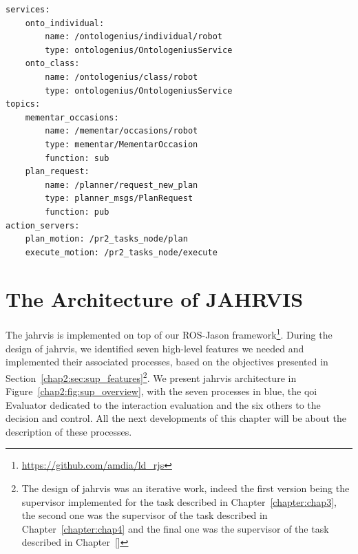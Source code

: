 \documentclass[a4paper,11pt,twoside]{StyleThese}
\begin{document}
\begin{lstlisting}[caption={Example of service, topic and action server definitions in a YAML file.}, label={chap2:lst:ros-jason}]
services:
	onto_individual: 
		name: /ontologenius/individual/robot
		type: ontologenius/OntologeniusService
	onto_class: 
		name: /ontologenius/class/robot
		type: ontologenius/OntologeniusService
topics:
	mementar_occasions: 
		name: /mementar/occasions/robot
		type: mementar/MementarOccasion
		function: sub
	plan_request:
		name: /planner/request_new_plan
		type: planner_msgs/PlanRequest
		function: pub
action_servers:
	plan_motion: /pr2_tasks_node/plan
	execute_motion: /pr2_tasks_node/execute
\end{lstlisting}


\section{The Architecture of JAHRVIS}\label{chap2:sec:jahrvis}
The \acrfull{jahrvis} is implemented on top of our ROS-Jason framework\footnote{\url{https://github.com/amdia/ld_rjs}}. During the design of \acrshort{jahrvis}, we identified seven high-level features we needed and implemented their associated processes, based on the objectives presented in Section~\ref{chap2:sec:sup_features}\footnote{The design of \acrshort{jahrvis} was an iterative work, indeed the first version being the supervisor implemented for the task described in Chapter~\ref{chapter:chap3}, the second one was the supervisor of the task described in Chapter~\ref{chapter:chap4} and the final one was the supervisor of the task described in Chapter~\ref{}}. We present \acrshort{jahrvis} architecture in Figure~\ref{chap2:fig:sup_overview}, with the seven processes in blue, the \acrshort{qoi} Evaluator dedicated to the interaction evaluation and the six others to the decision and control. All the next developments of this chapter will be about the description of these processes.
\end{document}
